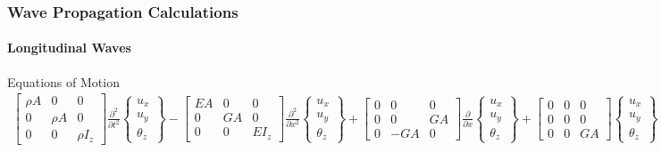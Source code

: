 \documentclass[aspectratio=169]{beamertmd}
\begin{document}
\begin{frame}[allowframebreaks]
  \frametitle{Wave Propagation Calculations}
  \framesubtitle{Longitudinal Waves}
  \begin{block}{Equations of Motion}
    {\tiny
      \begin{align*}
        \begin{bmatrix} \rho A & 0 & 0\\ 0 & \rho A & 0\\0 & 0 & \rho
          I_z \end{bmatrix} \frac{\partial^2}{\partial
                                                                 t^2}\begin{Bmatrix}
                                                                 u_x\\
                                                                 u_y\\\theta_z \end{Bmatrix}
        - \begin{bmatrix} EA & 0 & 0\\ 0 & GA & 0\\0 & 0 &
          EI_z \end{bmatrix} \frac{\partial^2}{\partial
                                                           x^2} \begin{Bmatrix}
                                                           u_x\\u_y\\\theta_z \end{Bmatrix}
        + \begin{bmatrix} 0 & 0 & 0\\ 0 & 0 & GA \\ 0 & -GA &
          0 \end{bmatrix} \frac{\partial}{\partial x}\begin{Bmatrix}
          u_x\\u_y\\\theta_z \end{Bmatrix} + \begin{bmatrix} 0 & 0 & 0
          \\ 0 & 0 & 0 \\ 0 & 0 & GA \end{bmatrix} \begin{Bmatrix}
          u_x\\ u_y\\\theta_z \end{Bmatrix} = \begin{Bmatrix} f_x\\

\end{Bmatrix}
\end{align*}}
\end{block}
\end{frame}
\end{document}
